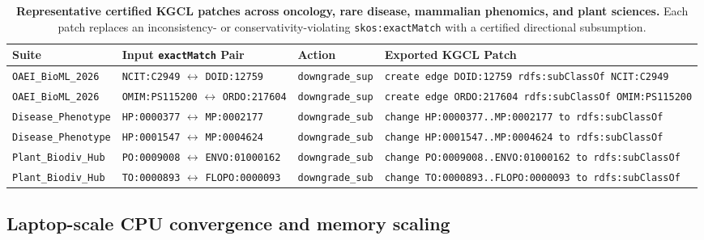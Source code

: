 \documentclass[10pt]{article}
\theoremstyle{accentdef}
\begin{document}
\begin{table}[t]
\centering
\caption{\textbf{Representative certified KGCL patches across oncology, rare disease, mammalian phenomics, and plant sciences.} Each patch replaces an inconsistency- or conservativity-violating \texttt{skos:exactMatch} with a certified directional subsumption.}
\label{tab:case_studies}
\footnotesize
\setlength{\tabcolsep}{4.5pt}
\begin{tabularx}{\textwidth}{@{}lll>{\raggedright\arraybackslash}X@{}}
\toprule
\textbf{Suite} & \textbf{Input \texttt{exactMatch} Pair} & \textbf{Action} & \textbf{Exported KGCL Patch} \\
\midrule
\texttt{OAEI\_BioML\_2026} & \texttt{NCIT:C2949} $\leftrightarrow$ \texttt{DOID:12759} & \texttt{downgrade\_sup} & \texttt{create edge DOID:12759 rdfs:subClassOf NCIT:C2949} \\
\texttt{OAEI\_BioML\_2026} & \texttt{OMIM:PS115200} $\leftrightarrow$ \texttt{ORDO:217604} & \texttt{downgrade\_sup} & \texttt{create edge ORDO:217604 rdfs:subClassOf OMIM:PS115200} \\
\texttt{Disease\_Phenotype} & \texttt{HP:0000377} $\leftrightarrow$ \texttt{MP:0002177} & \texttt{downgrade\_sub} & \texttt{change HP:0000377..MP:0002177 to rdfs:subClassOf} \\
\texttt{Disease\_Phenotype} & \texttt{HP:0001547} $\leftrightarrow$ \texttt{MP:0004624} & \texttt{downgrade\_sub} & \texttt{change HP:0001547..MP:0004624 to rdfs:subClassOf} \\
\texttt{Plant\_Biodiv\_Hub} & \texttt{PO:0009008} $\leftrightarrow$ \texttt{ENVO:01000162} & \texttt{downgrade\_sub} & \texttt{change PO:0009008..ENVO:01000162 to rdfs:subClassOf} \\
\texttt{Plant\_Biodiv\_Hub} & \texttt{TO:0000893} $\leftrightarrow$ \texttt{FLOPO:0000093} & \texttt{downgrade\_sub} & \texttt{change TO:0000893..FLOPO:0000093 to rdfs:subClassOf} \\
\bottomrule
\end{tabularx}
\end{table}

\subsection*{Laptop-scale CPU convergence and memory scaling}
\end{document}
